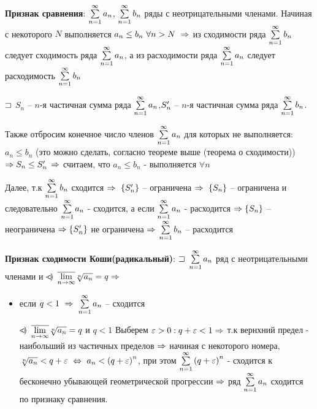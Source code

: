 \begin{proofs}
	\begin{enumerate*}
		\item \textbf{Признак сравнения}:  $\sum\limits_{n=1}^{\infty}a_n$, $\sum\limits_{n=1}^{\infty}b_n$ ряды с неотрицательными членами. Начиная с некоторого $N$ выполняется $a_n \leq b_n \ \forall n > N \ \sledue$ из сходимости ряда $\sum\limits_{n=1}^{\infty}b_n$ следует сходимость ряда $\sum\limits_{n=1}^{\infty}a_n$, а из расходимости ряда $\sum\limits_{n=1}^{\infty}a_n$ следует расходимость $\sum\limits_{n=1}^{\infty}b_n$
		\begin{dokvo}
			$\sqsupset$ $S_n$ -- $n$-я частичная сумма ряда $\sum\limits_{n=1}^{\infty}a_n$,$S_{n}^{\prime}$ -- $n$-я частичная сумма ряда $\sum\limits_{n=1}^{\infty}b_n$.

			Также отбросим конечное число членов $\sum\limits_{n=1}^{\infty}a_n$ для которых не выполняется: $a_n \leq b_n$ (это можно сделать, согласно теореме выше (теорема о сходимости)) $\Rightarrow S_n \leq S_{n}^{\prime}$ $\Rightarrow$ считаем, что $a_n \leq b_n$ - выполняется $\forall n$

			Далее, т.к $\sum\limits_{n=1}^{\infty}b_n$ сходится $\sledue \ \fskobk{S_{n}^{\shtrih}}$ -- ограничена $\Rightarrow \ \left\{ S_{n}\right\}$ -- ограничена и следовательно $\sum\limits_{n=1}^{\infty}a_n$ - сходится, а если $\sum\limits_{n=1}^{\infty}a_n$ - расходится $\Rightarrow \left\{ S_n\right\}$ -- неограничена $\Rightarrow \left\{ S_{n}^{\prime}\right\}$ не ограничена $\Rightarrow$ $\sum\limits_{n=1}^{\infty}b_n$ -- расходится
		\end{dokvo}

		\item  \textbf{Признак сходимости Коши(радикальный)}: $\sqsupset$ $\sum\limits_{n=1}^{\infty}a_n$ ряд с неотрицательными членами и $\mkern3mu\circ\mkern-19mu<\mkern-4mu)$ $\overline{\lim\limits_{n\to \infty}}\sqrt[n]{a_n} = q \Rightarrow$
		\begin{itemize}
			\item если $q < 1 \ \sledue \ \summa{n=1}{\infty}a_n$ -- сходится
			\begin{dokvo}
				$\mkern3mu\circ\mkern-19mu<\mkern-4mu)$ $\overline{\lim\limits_{n\to \infty}}\sqrt[n]{a_n} = q$ и $q < 1$ Выберем $\varepsilon >0: q + \varepsilon < 1 \Rightarrow$ т.к вернхний предел - наибольший из частичных пределов $\Rightarrow$ начиная с некоторого номера, $\sqrt[n]{a_n} < q + \epsilon \ \tittg \ a_n < \skobk{q + \epsilon}^{n}$, при этом $\sum\limits_{n=1}^{\infty}\left( q + \varepsilon\right)^{n}$ - сходится к бесконечно убывающей геометрической прогрессии $\Rightarrow$ ряд $\sum\limits_{n=1}^{\infty}a_n$ сходится по признаку сравнения.
			\end{dokvo}


\end{itemize}
\end{enumerate*}
\end{proofs}
